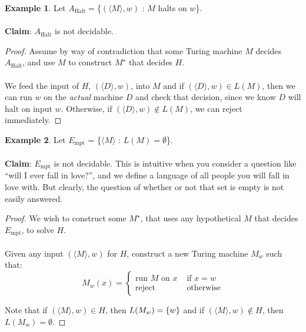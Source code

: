 \documentclass[]{article}
\DeclarePairedDelimiter{\set}{\lbrace}{\rbrace}
\theoremstyle{definition}
\newtheorem{ex}{Example}[section]
\begin{document}
      \begin{ex}
        Let $A_\text{Halt} = $\{$(\langle M \rangle, w)$ : $M$ halts on $w$\}.
        \\ \\
        \textbf{Claim}: $A_\text{Halt}$ is not decidable.

        \begin{proof}
          Assume by way of contradiction that some Turing machine $M$ decides $A_\text{Halt}$, and use $M$ to construct $M^\star$ that decides $H$.
          \\ \\
          We feed the input of $H$, $(\langle D \rangle, w)$, into $M$ and if $(\langle D \rangle, w) \in L(M)$, then we can run $w$ on the \emph{actual} machine $D$ and check that decision, since we know $D$ will halt on input $w$. Otherwise, if  $(\langle D \rangle, w) \not \in L(M)$, we can reject immediately.
        \end{proof}
      \end{ex}

      \begin{ex}
        Let $E_\text{mpt}$ = \{$\langle M \rangle$ : $L(M) = \emptyset$\}.
        \\ \\
        \textbf{Claim}: $E_\text{mpt}$ is not decidable. This is intuitive when you consider a question like ``will I ever fall in love?'', and we define a language of all people you will fall in love with. But clearly, the question of whether or not that set is empty is not easily answered.

        \begin{proof}
          We wish to construct some $M^\star$, that uses any hypothetical $M$ that decides $E_\text{mpt}$, to solve $H$.
          \\ \\
          Given any input $(\langle M \rangle, w)$ for $H$, construct a new Turing machine $M_w$ such that:
          $$
            M_w(x) = \begin{cases}
              \text{run } M \text{ on } x & \text{ if } x = w \\
              \text{reject} & \text{ otherwise}
            \end{cases}
          $$

          Note that if $(\langle M \rangle, w) \in H$, then $L(M_w) = \set{w}$ and if $(\langle M \rangle, w) \not \in H$, then $L(M_w) = \emptyset$.
        \end{proof}
      \end{ex}
\end{document}
